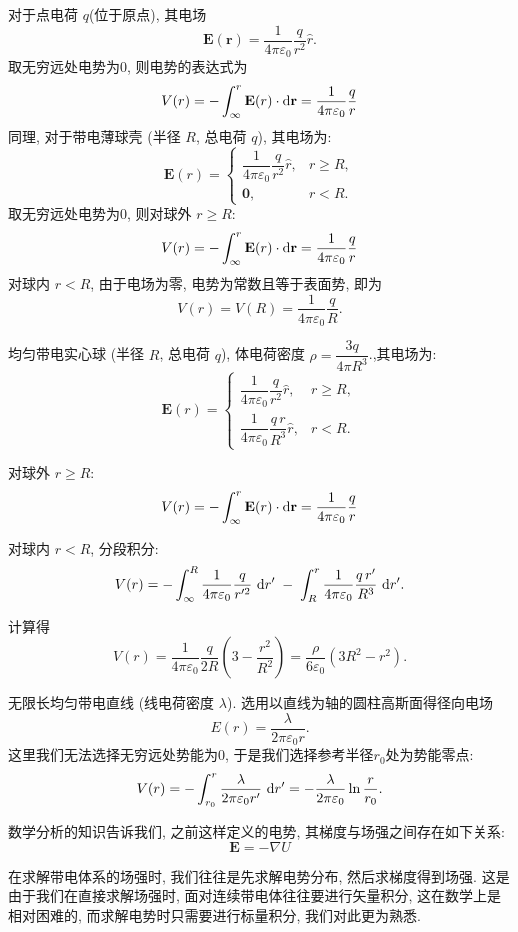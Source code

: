 \begin{example}[几种典型带电体系的电势分布]

对于点电荷 \(q\)(位于原点), 其电场
\[
\mathbf E(\mathbf r)=\frac{1}{4\pi\varepsilon_0}\frac{q}{r^2}\hat r.
\]
取无穷远处电势为0, 则电势的表达式为
\[
V(r)=-\int_{\infty}^{r}\mathbf E(r)\cdot \mathop{}\!\mathrm{d}\mathbf r
=\frac{1}{4\pi\varepsilon_0}\frac{q}{r}
\]
同理, 对于带电薄球壳 (半径 \(R\), 总电荷 \(q\)), 其电场为:
\[
\mathbf E(r)=
\begin{cases}
\dfrac{1}{4\pi\varepsilon_0}\dfrac{q}{r^2}\hat r, & r\ge R,\\[6pt]
\mathbf 0, & r<R.
\end{cases}
\]
取无穷远处电势为0, 则对球外 \(r\ge R\):
\[
V(r)=-\int_{\infty}^{r}\mathbf E(r)\cdot \mathop{}\!\mathrm{d}\mathbf r
=\frac{1}{4\pi\varepsilon_0}\frac{q}{r}
\]
对球内 \(r<R\), 由于电场为零, 电势为常数且等于表面势, 即为
\[
V(r)=V(R)=\frac{1}{4\pi\varepsilon_0}\frac{q}{R}.
\]

均匀带电实心球 (半径 \(R\), 总电荷 \(q\)), 体电荷密度 \(\rho=\dfrac{3q}{4\pi R^3}\).,其电场为:
\[
\mathbf E(r)=
\begin{cases}
\dfrac{1}{4\pi\varepsilon_0}\dfrac{q}{r^2}\hat r, & r\ge R,\\[8pt]
\dfrac{1}{4\pi\varepsilon_0}\dfrac{q\,r}{R^3}\hat r, & r<R.
\end{cases}
\]

对球外 \(r\ge R\):
\[
V(r)=-\int_{\infty}^{r}\mathbf E(r)\cdot \mathop{}\!\mathrm{d}\mathbf r
=\frac{1}{4\pi\varepsilon_0}\frac{q}{r}
\]

对球内 \(r<R\), 分段积分:
\[
V(r)= -\int_{\infty}^{R}\frac{1}{4\pi\varepsilon_0}\frac{q}{r'^2}\,\mathop{}\!\mathrm{d} r' \;-\;\int_{R}^{r}\frac{1}{4\pi\varepsilon_0}\frac{q\,r'}{R^3}\,\mathop{}\!\mathrm{d} r'.
\]

计算得
\[
V(r)=\frac{1}{4\pi\varepsilon_0}\frac{q}{2R}\left(3-\frac{r^2}{R^2}\right)=\frac{\rho}{6\varepsilon_0}(3R^2-r^2).
\]

无限长均匀带电直线 (线电荷密度 \(\lambda\)). 选用以直线为轴的圆柱高斯面得径向电场
\[
E(r)=\frac{\lambda}{2\pi\varepsilon_0 r}.
\]
这里我们无法选择无穷远处势能为0, 于是我们选择参考半径$r_0$处为势能零点:
\[
V(r)=-\int_{r_0}^{r}\frac{\lambda}{2\pi\varepsilon_0 r'}\,\mathop{}\!\mathrm{d} r'=-\frac{\lambda}{2\pi\varepsilon_0}\ln\frac{r}{r_0}.
\]

\end{example}

数学分析的知识告诉我们, 之前这样定义的电势, 其梯度与场强之间存在如下关系:
\[
\mathbf{E} = -\nabla U
\]

在求解带电体系的场强时, 我们往往是先求解电势分布, 然后求梯度得到场强. 这是由于我们在直接求解场强时, 面对连续带电体往往要进行矢量积分, 这在数学上是相对困难的, 而求解电势时只需要进行标量积分, 我们对此更为熟悉.

